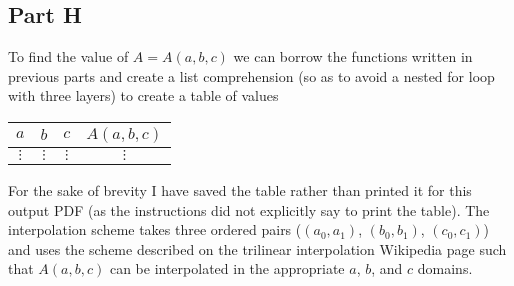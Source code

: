 \subsection{Part H}

To find the value of $A = A(a,b,c)$ we can borrow the functions written in previous parts and create a list comprehension (so as to avoid a nested for loop with three layers) to create a table of values 

\begin{tabular}{c | c | c | c}
$a$ & $b$ & $c$ & $A(a,b,c)$ \\
\hline
$\vdots$ & $\vdots$ & $\vdots$ & $\vdots$ 
\end{tabular}

For the sake of brevity I have saved the table rather than printed it for this output PDF (as the instructions did not explicitly say to print the table). The interpolation scheme takes three ordered pairs ($(a_{0}, a_{1})$, $(b_{0}, b_{1})$, $(c_{0}, c_{1})$) and uses the scheme described on the trilinear interpolation Wikipedia page such that $A(a,b,c)$ can be interpolated in the appropriate $a$, $b$, and $c$ domains.


